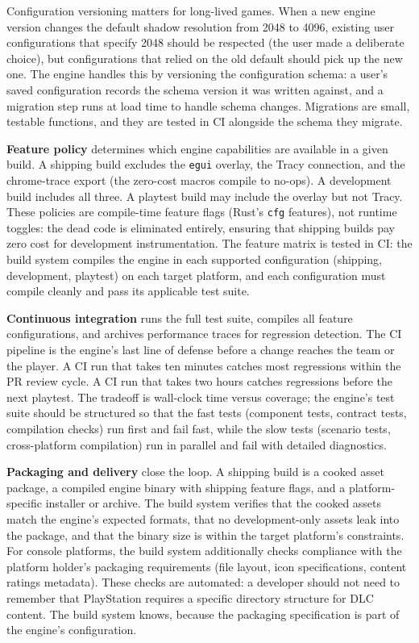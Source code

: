 \documentclass[
  11pt,
  letterpaper,
  DIV=11,
  numbers=noendperiod,
  twoside,
  open=right]{scrreprt}
\begin{document}
Configuration versioning matters for long-lived games. When a new engine
version changes the default shadow resolution from 2048 to 4096,
existing user configurations that specify 2048 should be respected (the
user made a deliberate choice), but configurations that relied on the
old default should pick up the new one. The engine handles this by
versioning the configuration schema: a user's saved configuration
records the schema version it was written against, and a migration step
runs at load time to handle schema changes. Migrations are small,
testable functions, and they are tested in CI alongside the schema they
migrate.

\textbf{Feature policy} determines which engine capabilities are
available in a given build. A shipping build excludes the \texttt{egui}
overlay, the Tracy connection, and the chrome-trace export (the
zero-cost macros compile to no-ops). A development build includes all
three. A playtest build may include the overlay but not Tracy. These
policies are compile-time feature flags (Rust's \texttt{cfg} features),
not runtime toggles: the dead code is eliminated entirely, ensuring that
shipping builds pay zero cost for development instrumentation. The
feature matrix is tested in CI: the build system compiles the engine in
each supported configuration (shipping, development, playtest) on each
target platform, and each configuration must compile cleanly and pass
its applicable test suite.

\textbf{Continuous integration} runs the full test suite, compiles all
feature configurations, and archives performance traces for regression
detection. The CI pipeline is the engine's last line of defense before a
change reaches the team or the player. A CI run that takes ten minutes
catches most regressions within the PR review cycle. A CI run that takes
two hours catches regressions before the next playtest. The tradeoff is
wall-clock time versus coverage; the engine's test suite should be
structured so that the fast tests (component tests, contract tests,
compilation checks) run first and fail fast, while the slow tests
(scenario tests, cross-platform compilation) run in parallel and fail
with detailed diagnostics.

\textbf{Packaging and delivery} close the loop. A shipping build is a
cooked asset package, a compiled engine binary with shipping feature
flags, and a platform-specific installer or archive. The build system
verifies that the cooked assets match the engine's expected formats,
that no development-only assets leak into the package, and that the
binary size is within the target platform's constraints. For console
platforms, the build system additionally checks compliance with the
platform holder's packaging requirements (file layout, icon
specifications, content ratings metadata). These checks are automated: a
developer should not need to remember that PlayStation requires a
specific directory structure for DLC content. The build system knows,
because the packaging specification is part of the engine's
configuration.
\end{document}
